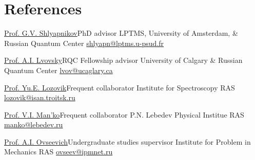 \documentclass[10pt,a4paper,sans]{moderncv}
\begin{document}
\section{References}

	{{\textcolor{blue}{\href{http://qis.ucalgary.ca/~lvov/}
	{Prof. G.V. Shlyapnikov}}}}{}{PhD advisor}
	{\newline LPTMS, University of Amsterdam, \& Russian Quantum Center}
	{\textcolor{blue}{\href{mailto:shlyapn@lptms.u-psud.fr}{shlyapn@lptms.u-psud.fr}}}{}

	{{\textcolor{blue}{\href{http://qis.ucalgary.ca/~lvov/}
	{Prof. A.I. Lvovsky}}}}{}{RQC Fellowship advisor}
	{\newline University of Calgary \& Russian Quantum Center}
	{\textcolor{blue}{\href{mailto:lvov@ucaglary.ca}{lvov@ucaglary.ca}}}{}
	
	{{\textcolor{blue}{\href{http://isan.troitsk.ru/ru/div_lsn.php}
	{Prof. Yu.E. Lozovik}}}}{}{Frequent collaborator}
	{\newline Institute for Spectroscopy RAS}
	{\textcolor{blue}{\href{mailto:lozovik@isan.troitsk.ru}{lozovik@isan.troitsk.ru}}}{}	
	
	{{\textcolor{blue}{\href{}
	{Prof. V.I. Man'ko}}}}{}{Frequent collaborator}
	{\newline P.N. Lebedev Physical Institue RAS}
	{\textcolor{blue}{\href{mailto:manko@lebedev.ru}{manko@lebedev.ru}}}
	
	{{\textcolor{blue}{\href{http://www.ipmnet.ru/lab02/Ovseevich.htm}
	{Prof. A.I. Ovseevich}}}}{}{Undergraduate studies supervisor}
	{\newline Institute for Problem in Mechanics RAS}
	{\textcolor{blue}{\href{mailto:ovseev@ipmnet.ru}{ovseev@ipmnet.ru}}}
	

\end{document}
